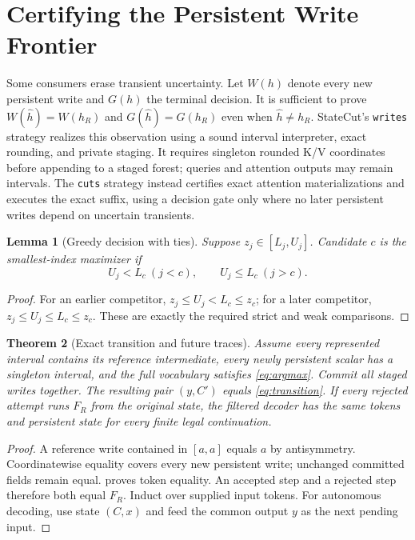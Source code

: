 \documentclass{article}
\theoremstyle{plain}
\newtheorem{theorem}{Theorem}
\newtheorem{lemma}[theorem]{Lemma}
\theoremstyle{definition}
\theoremstyle{remark}
\newcommand{\code}[1]{\texttt{\small #1}}
\begin{document}
\section{Certifying the Persistent Write Frontier}
\label{sec:writes}

Some consumers erase transient uncertainty. Let $W(h)$ denote every new
persistent write and $G(h)$ the terminal decision. It is sufficient to prove
$W(\hat h)=W(h_R)$ and $G(\hat h)=G(h_R)$ even when
$\hat h\ne h_R$. StateCut's \code{writes} strategy realizes this
observation using a sound interval interpreter, exact rounding, and private
staging. It requires singleton rounded K/V coordinates before appending to
a staged forest; queries and attention outputs may remain intervals.
The \code{cuts} strategy instead certifies exact attention
materializations and executes the exact suffix, using a decision gate only
where no later persistent writes depend on uncertain transients.

\begin{lemma}[Greedy decision with ties]
\label{lem:argmax}
Suppose $z_j\in[L_j,U_j]$. Candidate $c$ is the smallest-index maximizer if
\begin{equation}
 U_j<L_c\ (j<c),\qquad U_j\le L_c\ (j>c).
 \label{eq:argmax}
\end{equation}
\end{lemma}
\begin{proof}
For an earlier competitor, $z_j\le U_j<L_c\le z_c$; for a later
competitor, $z_j\le U_j\le L_c\le z_c$. These are exactly the required
strict and weak comparisons.
\end{proof}

\begin{theorem}[Exact transition and future traces]
\label{thm:state}
Assume every represented interval contains its reference intermediate,
every newly persistent scalar has a singleton interval, and the full
vocabulary satisfies \cref{eq:argmax}. Commit all staged writes together.
The resulting pair $(y,C')$ equals \cref{eq:transition}. If every rejected
attempt runs $F_R$ from the original state, the filtered decoder has the
same tokens and persistent state for every finite legal continuation.
\end{theorem}
\begin{proof}
A reference write contained in $[a,a]$ equals $a$ by antisymmetry.
Coordinatewise equality covers every new persistent write; unchanged
committed fields remain equal.  proves token equality.
An accepted step and a rejected step therefore both equal $F_R$. Induct
over supplied input tokens. For autonomous decoding, use state $(C,x)$
and feed the common output $y$ as the next pending input.
\end{proof}
\end{document}
